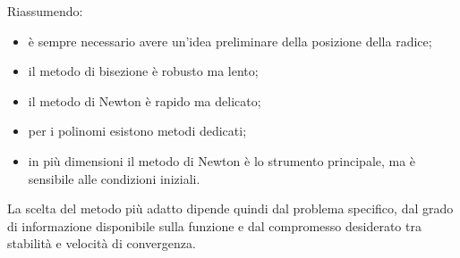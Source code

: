 Riassumendo:

\begin{itemize}
	\item è sempre necessario avere un'idea preliminare della posizione della radice;
	\item il metodo di bisezione è robusto ma lento;
	\item il metodo di Newton è rapido ma delicato;
	\item per i polinomi esistono metodi dedicati;
	\item in più dimensioni il metodo di Newton è lo strumento principale, ma è sensibile alle condizioni iniziali.
\end{itemize}

\bigskip

La scelta del metodo più adatto dipende quindi dal problema specifico, dal grado di informazione disponibile sulla funzione e dal compromesso desiderato tra stabilità e velocità di convergenza.
